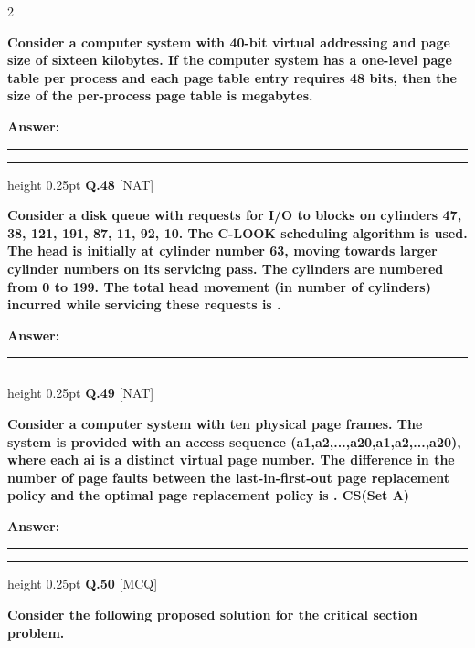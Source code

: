 \documentclass[a4paper,10pt,twoside]{article}
\begin{document}
\begin{multicols}{2}
{\bfseries Consider a computer system with 40-bit virtual addressing and page size of sixteen
kilobytes. If the computer system has a one-level page table per process and each page table
entry requires 48 bits, then the size of the per-process page table is
megabytes. \par}
\par\vspace{3pt}\noindent\textbf{Answer:} \rule{3.2cm}{0.4pt}
\par\vspace{6pt}\hrule height 0.25pt\vspace{6pt}
\noindent\textbf{Q.48} \hfill {\footnotesize\textsf{[NAT]}}
\par\vspace{2pt}
{\bfseries Consider a disk queue with requests for I/O to blocks on cylinders 47, 38, 121, 191, 87, 11,
92, 10. The C-LOOK scheduling algorithm is used. The head is initially at cylinder number
63, moving towards larger cylinder numbers on its servicing pass. The cylinders are numbered
from 0 to 199. The total head movement (in number of cylinders) incurred while servicing
these requests is
. \par}
\par\vspace{3pt}\noindent\textbf{Answer:} \rule{3.2cm}{0.4pt}
\par\vspace{6pt}\hrule height 0.25pt\vspace{6pt}
\noindent\textbf{Q.49} \hfill {\footnotesize\textsf{[NAT]}}
\par\vspace{2pt}
{\bfseries Consider a computer system with ten physical page frames. The system is provided with
an access sequence (a1,a2,...,a20,a1,a2,...,a20), where each ai is a distinct virtual page
number.
The difference in the number of page faults between the last-in-ﬁrst-out page
replacement policy and the optimal page replacement policy is
.
CS(Set A) \par}
\par\vspace{3pt}\noindent\textbf{Answer:} \rule{3.2cm}{0.4pt}
\par\vspace{6pt}\hrule height 0.25pt\vspace{6pt}
\noindent\textbf{Q.50} \hfill {\footnotesize\textsf{[MCQ]}}
\par\vspace{2pt}
{\bfseries Consider the following proposed solution for the critical section problem.
}
\end{multicols}
\end{document}
